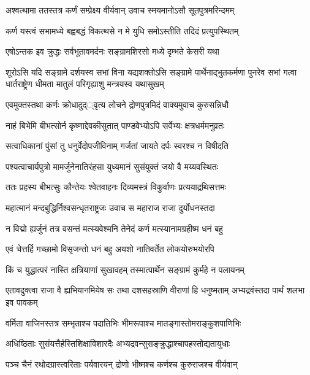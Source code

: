 \twolineshloka
{अश्वत्थामा ततस्तत्र कर्णं सम्प्रेक्ष्य वीर्यवान्}
{उवाच स्मयमानोऽसौ सूतपुत्रमरिन्दमम्}


\twolineshloka
{कर्ण यस्त्वं सभामध्ये बह्वबद्धं विकत्थसे}
{न मे युधि समोऽस्तीति तदिदं प्रत्युपस्थितम्}


\twolineshloka
{एषोऽन्तक इव क्रुद्धः सर्वभूतावमर्दनः}
{सङ्ग्रामशिरसो मध्ये दृम्भते केसरी यथा}


\onelineshloka
{शूरोऽसि यदि सङ्ग्रामे दर्शयस्व सभां विना}
\threelineshloka
{यद्यशक्तोऽसि सङ्ग्रामे पार्थेनाद्भुतकर्मणा}
{पुनरेव सभां गत्वा धार्तराष्ट्रेण धीमता}
{मातुलं परिगृह्याशु मन्त्रयस्व यथासुखम्}



\twolineshloka
{एवमुक्तस्तथा कर्णः क्रोधादुद््वृत्य लोचने}
{द्रोणपुत्रमिदं वाक्यमुवाच कुरुसन्निधौ}


\twolineshloka
{नाहं बिभेमि बीभत्सोर्न कृष्णाद्देवकीसुतात्}
{पाण्डवेभ्योऽपि सर्वेभ्यः क्षत्रधर्ममनुव्रतः}


\twolineshloka
{सत्वाधिकानां पुंसां तु धनुर्वेदोपजीविनाम्}
{गर्जतां जायते दर्पः स्वरश्च न विषीदति}


\twolineshloka
{पश्यत्वाचार्यपुत्रो मामर्जुनेनातिरंहसा}
{युध्यमानं सुसंयुक्तं जयो वै मय्यवस्थितः}



\twolineshloka
{ततः प्रहस्य बीभत्सुः कौन्तेयः श्वेतवाहनः}
{दिव्यमस्त्रं विकुर्वाणः प्रत्ययाद्रथिसत्तमः}


\twolineshloka
{महात्मानं मन्दबुद्धिर्निश्वसन्धृतराष्ट्रजः}
{उवाच स महाराज राजा दुर्योधनस्तदा}


\twolineshloka
{न विद्मो ह्यर्जुनं तत्र वसन्तं मत्स्यवेश्मनि}
{तेनेदं कर्ण मत्स्यानामग्रहीष्म धनं बहु}


\twolineshloka
{एवं चेत्तर्हि गच्छामो विसृजन्तो धनं बहु}
{अयशो नातिवर्तेत लोकयोरुभयोरपि}


\twolineshloka
{किं च युद्धात्परं नास्ति क्षत्रियाणां सुखावहम्}
{तस्मात्पार्थेन सङ्ग्रामं कुर्महे न पलायनम्}


\threelineshloka
{एतावदुक्त्वा राजा वै ह्यभियानमियेष सः}
{तथा दशसहस्राणि वीराणां हि धनुष्मताम्}
{अभ्यद्रवंस्तदा पार्थं शलभा इव पावकम्}


\twolineshloka
{वर्मिता वाजिनस्तत्र सम्भृताश्च पदातिभिः}
{भीमरूपाश्च मातङ्गास्तोमराङ्कुशपाणिभिः}



\twolineshloka
{अधिष्ठिताः सुसंयत्तैर्हस्तिशिक्षाविशारदैः}
{अभ्यद्रवन्सुसङ्क्रुद्धाश्चापहस्तोद्यतायुधाः}


\twolineshloka
{पञ्च चैनं रथोदग्रास्त्वरिताः पर्यवारयन्}
{द्रोणो भीष्मश्च कर्णश्च कुरुराजश्च वीर्यवान्}



